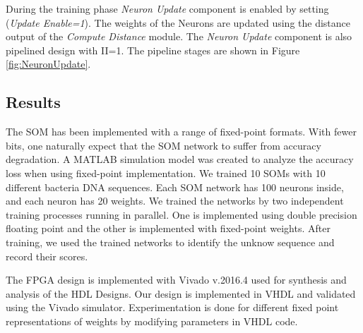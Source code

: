 \documentclass[a4paper,10pt]{article}
\begin{document}
During the training phase \textit{Neuron Update} component is enabled by setting (\textit{Update Enable=1}). The weights of the Neurons are updated using the distance output of the \textit{Compute Distance} module. The \textit{Neuron Update} component is also pipelined design with II=1. The pipeline stages are shown in Figure \ref{fig:NeuronUpdate}.
\subsection{Results}
The SOM has been implemented with a range of fixed-point formats. With fewer bits, one naturally expect that the SOM network to suffer from accuracy degradation. A MATLAB simulation model was created to analyze the accuracy loss when using fixed-point implementation. We trained 10 SOMs with 10 different bacteria DNA sequences. Each SOM network has 100 neurons inside, and each neuron has 20 weights. We trained the networks by two independent training processes running in parallel. One is implemented using double precision floating point and the other is implemented with fixed-point weights. After training, we used the trained networks to identify the unknow sequence and record their scores.

The FPGA design is implemented with Vivado v.2016.4 used for synthesis and analysis of the HDL Designs. Our design is implemented in VHDL and validated using the Vivado simulator. Experimentation is done for different fixed point representations of weights by modifying parameters in VHDL code. 
\end{document}
